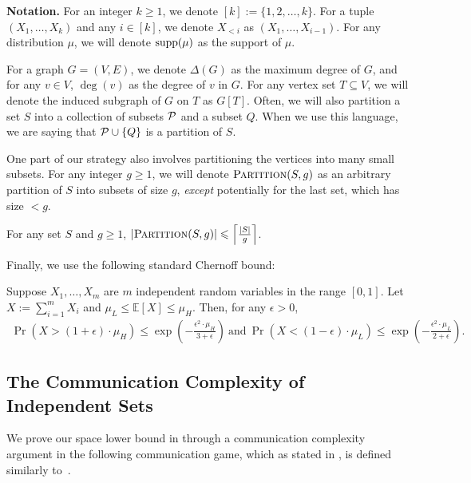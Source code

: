 \documentclass[11pt]{article}
\begin{document}
\textbf{Notation. } For an integer $k\ge 1$, we denote $[k]:=\{1,2,\dots,k\}$. For a tuple $(X_1, \dots, X_k)$ and any $i\in [k]$, we denote $X_{<i}$ as $(X_1, \dots, X_{i-1})$. For any distribution $\mu$, we will denote $\textnormal{\text{supp}}(\mu)$ as the support of $\mu$. 

For a graph $G=(V, E)$, we denote $\Delta{(G)}$ as the maximum degree of $G$, and for any $v\in V$, $\deg{(v)}$ as the degree of $v$ in $G$. For any vertex set $T\subseteq V$, we will denote the induced subgraph of $G$ on $T$ as $G[T]$. Often, we will also partition a set $S$ into a collection of subsets $\mathcal{P}$ and a subset $Q$. When we use this language, we are saying that $\mathcal{P}\cup \{Q\}$ is a partition of $S$. 

One part of our strategy also involves partitioning the vertices into many small subsets. For any integer $g\ge 1$, we will denote $\textnormal{\textsc{Partition}}(S, g)$ as an arbitrary partition of $S$ into subsets of size $g$, \textit{except} potentially for the last set, which has size $<g$. 
\begin{fact}\label{partition-count}
    For any set $S$ and $g\ge 1$, $|\textnormal{\textsc{Partition}}(S, g)|\leqslant \left\lceil\frac{|S|}g\right\rceil$.
\end{fact}

Finally, we use the following standard Chernoff bound:

\begin{proposition}\label{chernoff}
    Suppose $X_1, \dots, X_m$ are $m$ independent random variables in the range $[0, 1]$. Let $X:=\sum_{i=1}^m X_i$ and $\mu_L\le \mathbb{E}[X]\le \mu_H$. Then, for any $\epsilon > 0$,
    \begin{align*}
        \Pr(X > (1 + \epsilon)\cdot \mu_H)\le\exp\left(-\frac{\epsilon^2\cdot\mu_H}{3+\epsilon}\right)~\mathrm{and}~\Pr\left(X < (1-\epsilon)\cdot \mu_L\right)\le\exp\left(-\frac{\epsilon^2\cdot\mu_L}{2+\epsilon}\right).
    \end{align*}
\end{proposition}

\subsection{The Communication Complexity of Independent Sets}
We prove our space lower bound in  through a communication complexity argument in the following communication game, which as stated in , is defined similarly to~\cite{assadi2022deterministic}.
\end{document}

